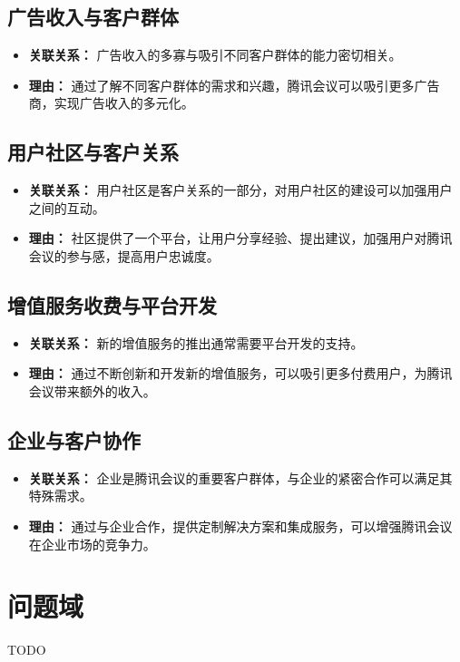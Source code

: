 \documentclass[a4paper,12pt]{article}
\begin{document}
\subsection{广告收入与客户群体}
\begin{itemize}
\item\textbf{关联关系：} 广告收入的多寡与吸引不同客户群体的能力密切相关。 
\item\textbf{理由：} 通过了解不同客户群体的需求和兴趣，腾讯会议可以吸引更多广告商，实现广告收入的多元化。
\end{itemize}
\subsection{用户社区与客户关系}
\begin{itemize}
\item\textbf{关联关系：} 用户社区是客户关系的一部分，对用户社区的建设可以加强用户之间的互动。 
\item\textbf{理由：} 社区提供了一个平台，让用户分享经验、提出建议，加强用户对腾讯会议的参与感，提高用户忠诚度。
\end{itemize}
\subsection{增值服务收费与平台开发}
\begin{itemize}
\item\textbf{关联关系：} 新的增值服务的推出通常需要平台开发的支持。 
\item\textbf{理由：} 通过不断创新和开发新的增值服务，可以吸引更多付费用户，为腾讯会议带来额外的收入。
\end{itemize}
\subsection{企业与客户协作}
\begin{itemize}
\item\textbf{关联关系：} 企业是腾讯会议的重要客户群体，与企业的紧密合作可以满足其特殊需求。 
\item\textbf{理由：} 通过与企业合作，提供定制解决方案和集成服务，可以增强腾讯会议在企业市场的竞争力。
\end{itemize}

\section{问题域}
TODO
\end{document}
